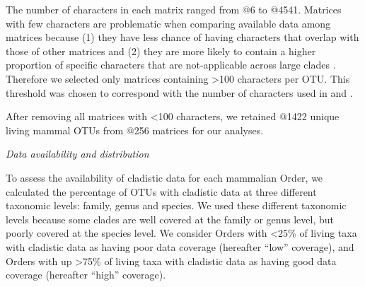 \documentclass[12pt,letterpaper]{article}
\renewcommand{\subsection}[1]{%
\bigskip
\begin{center}
\begin{large}
\normalfont\itshape #1
\end{large}
\end{center}}
\begin{document}
The number of characters in each matrix ranged from @6 to @4541.
Matrices with few characters %
are problematic when comparing available data among matrices because (1) they have less chance of having characters that overlap with those of other matrices \citep{wagner2000} and (2) they are more likely to contain a higher proportion of specific characters that are not-applicable across large clades \citep[][e.g. ``antler ramifications'' is a character that is only applicable to Cervidae not all mammals]{Brazeau2011}.
Therefore we selected only matrices containing \textgreater 100 characters per OTU.
This threshold was chosen to correspond with the number of characters used in \citet{GuillermeCooper} and \citet{harrisonamong-character2014}.

After removing all matrices with \textless 100 characters, we retained @1422 unique living mammal OTUs from @256 matrices for our analyses.

\subsection{Data availability and distribution}
To assess the availability of cladistic data for each mammalian Order, we calculated the percentage of OTUs with cladistic data at three different taxonomic levels: family, genus and species.
We used these different taxonomic levels because some clades are well covered at the family or genus level, but poorly covered at the species level.
We consider Orders with \textless 25\% of living taxa with cladistic data as having poor data coverage (hereafter ``low'' coverage), and Orders with up \textgreater 75\% of living taxa with cladistic data as having good data coverage (hereafter ``high'' coverage). 
\end{document}
